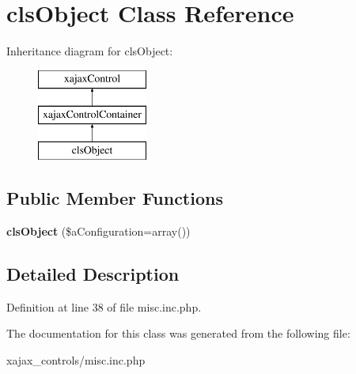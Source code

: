 \hypertarget{classclsObject}{
\section{clsObject Class Reference}
\label{classclsObject}
}
Inheritance diagram for clsObject:\begin{figure}[H]
\begin{center}
\leavevmode
\includegraphics[height=3.000000cm]{classclsObject}
\end{center}
\end{figure}
\subsection*{Public Member Functions}
\begin{DoxyCompactItemize}
\item 
\hypertarget{classclsObject_a57a9f5e2bd8fb2ea9183b72b5f772b1f}{
{\bfseries clsObject} (\$aConfiguration=array())}
\label{classclsObject_a57a9f5e2bd8fb2ea9183b72b5f772b1f}

\end{DoxyCompactItemize}


\subsection{Detailed Description}


Definition at line 38 of file misc.inc.php.



The documentation for this class was generated from the following file:\begin{DoxyCompactItemize}
\item 
xajax\_\-controls/misc.inc.php\end{DoxyCompactItemize}

